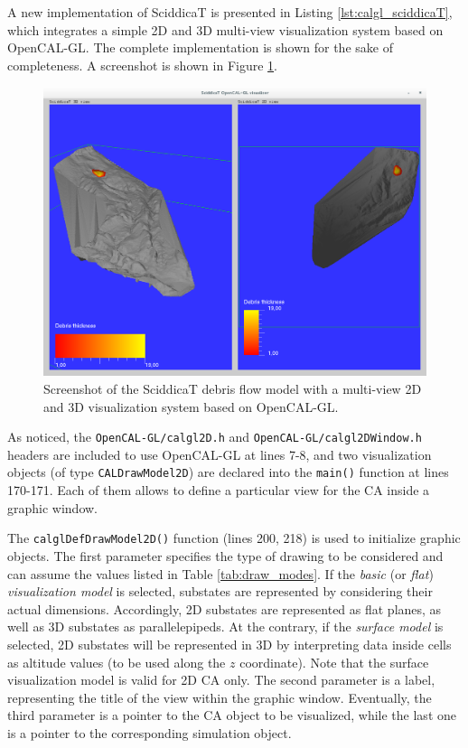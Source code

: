 A new implementation of SciddicaT is presented in Listing
\ref{lst:calgl_sciddicaT}, which integrates a simple 2D and 3D
multi-view visualization system based on OpenCAL-GL. The complete
implementation is shown for the sake of completeness. A screenshot is
shown in Figure \ref{fig:calgl_sciddicaT1}.

\begin{figure}
  \begin{center}
    \includegraphics[width=11.4cm]{./images/OpenCAL/calgl_sciddicaT1}
    \caption{Screenshot of the SciddicaT debris flow model with a
      multi-view 2D and 3D visualization system based on OpenCAL-GL.}
    \label{fig:calgl_sciddicaT1}
  \end{center}
\end{figure}



As noticed, the \verb'OpenCAL-GL/calgl2D.h' and
\verb'OpenCAL-GL/calgl2DWindow.h' headers are included to use
OpenCAL-GL at lines 7-8, and two visualization objects (of type
\verb'CALDrawModel2D') are declared into the \verb'main()' function
at lines 170-171. Each of them allows to define a particular view for
the CA inside a graphic window.

The \verb'calglDefDrawModel2D()' function (lines 200, 218) is used to
initialize graphic objects. The first parameter specifies the type of
drawing to be considered and can assume the values listed in Table
\ref{tab:draw_modes}. If the \emph{basic} (or \emph{flat})
\emph{visualization model} is selected, substates are represented by
considering their actual dimensions. Accordingly, 2D substates are
represented as flat planes, as well as 3D substates as
parallelepipeds. At the contrary, if the \emph{surface model} is
selected, 2D substates will be represented in 3D by interpreting data
inside cells as altitude values (to be used along the $z$
coordinate). Note that the surface visualization model is valid for 2D
CA only. The second parameter is a label, representing the title of the
view within the graphic window. Eventually, the third parameter is a
pointer to the CA object to be visualized, while the last one is a
pointer to the corresponding simulation object.

